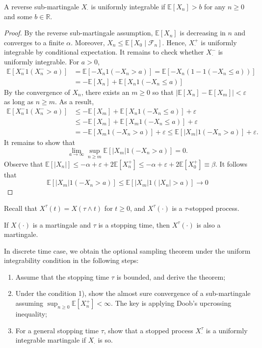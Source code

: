 \begin{proposition}
A reverse sub-martingale $X_{\cdot}$ is uniformly integrable if $\mathbb{E}[X_n]>b$ for any $n\ge0$ and some $b\in\mathbb{R}$.
\end{proposition}
\begin{proof}
By the reverse sub-martingale assumption, $\mathbb{E}[X_n]$ is decreasing in $n$ and converges to a finite $\alpha$. Moreover, $X_n\le \mathbb{E}[X_0\mid\mathcal{F}_n]$.
Hence, $X_{\cdot}^+$ is uniformly integrable by conditional expectation.
It remains to check whether $X_{\cdot}^-$ is uniformly integrable.
For $a>0$,
\begin{align*}
\mathbb{E}[X_n^{-}1(X_n^->a)]&=\mathbb{E}[-X_n1(-X_n>a)]=\mathbb{E}[-X_n(1 - 1(-X_n\le a))]\\
&=-\mathbb{E}[X_n] + \mathbb{E}[X_n1(-X_n\le a)]
\end{align*}
By the convergence of $X_n$, there exists an $m\ge0$ so that $|\mathbb{E}[X_n]-\mathbb{E}[X_m]|<\varepsilon$ as long as $n\ge m$.
As a result,
\begin{align*}
\mathbb{E}[X_n^{-}1(X_n^->a)]&\le -\mathbb{E}[X_m] + \mathbb{E}[X_n1(-X_n\le a)]+\varepsilon\\
&\le -\mathbb{E}[X_m] + \mathbb{E}[X_m1(-X_n\le a)]+\varepsilon\\
&=-\mathbb{E}[X_m1(-X_n>a)]+\varepsilon\le \mathbb{E}[|X_m|1(-X_n>a)]+\varepsilon.
\end{align*}
It remains to show that 
\[
\lim_{a\to\infty}\sup_{n\ge m}\mathbb{E}[|X_m|1(-X_n>a)]=0.
\]
Observe that $\mathbb{E}[|X_n|]\le -\alpha+\varepsilon+2\mathbb{E}[X_n^+]\le -\alpha+\varepsilon+2\mathbb{E}[X_0^+]\equiv\beta$.
It follows that 
\[
\mathbb{E}[|X_m|1(-X_n>a)]\le \mathbb{E}[|X_m|1(|X_n|>a)]\to0
\]
\end{proof}

Recall that $X^{\tau}(t)=X(\tau\land t)$ for $t\ge0$, and $X^{\tau}(\cdot)$ is a $\tau$-stopped process.
\begin{proposition}
If $X(\cdot)$ is a martingale and $\tau$ is a stopping time, then $X^{\tau}(\cdot)$ is also a martingale.
\end{proposition}

In discrete time case, we obtain the optional sampling theorem under the uniform integrability condition in the following steps:
\begin{enumerate}
\item
Assume that the stopping time $\tau$ is bounded, and derive the theorem;
\item
Under the condition 1), show the almost sure convergence of a sub-martingale assuming $\sup_{n\ge0}\mathbb{E}[X_n^+]<\infty$. The key is applying Doob's upcrossing inequality;
\item
For a general stopping time $\tau$, show that a stopped process $X_{\cdot}^{\tau}$ is a uniformly integrable martingale if $X_{\cdot}$ is so. 
\end{enumerate}

